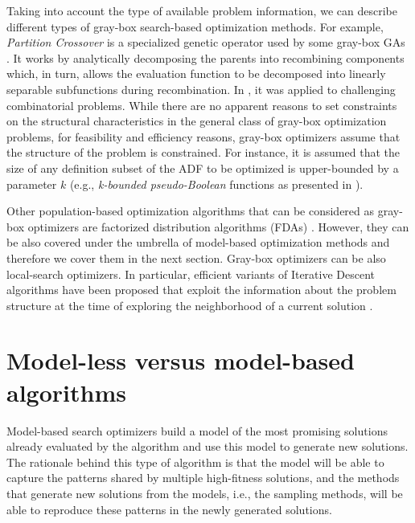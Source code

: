   Taking into account the type of available problem information,  we can describe different types of gray-box search-based optimization methods. For example, \emph{Partition Crossover} is a specialized genetic operator used by some gray-box GAs  \cite{Tinos_et_al:2015,Whitley:2015}. It works by analytically decomposing the  parents into recombining components which, in turn, allows the evaluation function to be decomposed into linearly separable subfunctions during recombination. In \cite{Tinos_et_al:2015}, it was applied to challenging combinatorial problems.   While there are no apparent reasons to set constraints on the structural characteristics  in the general class of gray-box optimization problems, for feasibility and efficiency reasons, gray-box optimizers assume that the  structure of the problem is constrained. For instance, it is assumed that the size of any definition subset of the ADF to be optimized is upper-bounded by a parameter $k$ (e.g.,  \emph{k-bounded pseudo-Boolean} functions as presented in \cite{Whitley:2015}).

  Other population-based optimization algorithms that can be considered as gray-box optimizers are factorized distribution algorithms (FDAs) \cite{Muhlenbein_et_al:1999}. However, they can be also covered under the umbrella of model-based optimization methods and therefore we cover them in the next section. Gray-box optimizers can be also local-search optimizers. In particular, efficient variants of Iterative Descent algorithms have been proposed that exploit the information about the problem structure at the time of exploring the neighborhood of a current solution \cite{Chicano_et_al:2016,Whitley_et_al:2013}.

 

 \section{Model-less versus model-based algorithms}  \label{sec:LESS_VS_MODEL}


 Model-based search optimizers build a model of the most promising solutions already evaluated by the algorithm and use this model to generate new solutions. The rationale behind this type of algorithm is that the model will be able to capture the patterns shared by multiple high-fitness solutions, and the  methods that generate new solutions from the models, i.e., the sampling methods, will be able to reproduce these patterns in the newly generated solutions.

